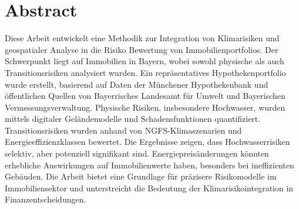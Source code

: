 

\section*{Abstract}
Diese Arbeit entwickelt eine Methodik zur Integration von Klimarisiken und geospatialer Analyse in die Risiko Bewertung von Immobilienportfolios. Der Schwerpunkt liegt auf Immobilien in Bayern, wobei sowohl physische als auch Transitionsrisiken analysiert wurden. Ein repräsentatives Hypothekenportfolio wurde erstellt, basierend auf Daten der Münchener Hypothekenbank und öffentlichen Quellen von Bayerrisches Landesamt für Umwelt und Bayerischen Vermessungsverwaltung. Physische Risiken, insbesondere Hochwasser, wurden mittels digitaler Geländemodelle und Schadensfunktionen quantifiziert. Transitionsrisiken wurden anhand von NGFS-Klimaszenarien und Energieeffizienzklassen bewertet. Die Ergebnisse zeigen, dass Hochwasserrisiken selektiv, aber potenziell signifikant sind. Energiepreisänderungen könnten erhebliche Auswirkungen auf Immobilienwerte haben, besonders bei ineffizienten Gebäuden. Die Arbeit bietet eine Grundlage für präzisere Risikomodelle im Immobiliensektor und unterstreicht die Bedeutung der Klimarisikointegration in Finanzentscheidungen.



